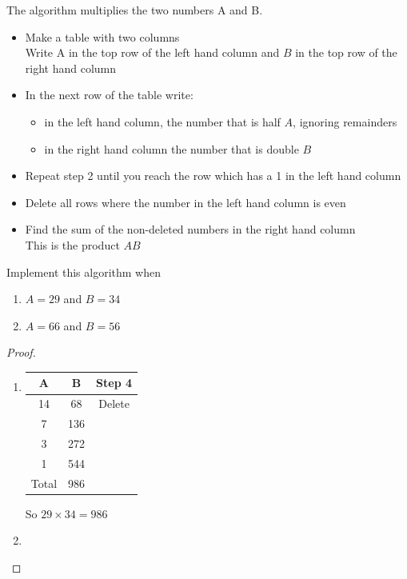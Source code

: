 \documentclass[a4paper]{article}
\begin{document}
\begin{eg}
	The algorithm multiplies the two numbers A and B.
	\begin{itemize}
		\item Make a table with two columns\\Write A in the top row of the left hand column and $B$ in the top row of the right hand column
		\item In the next row of the table write: \begin{itemize}\item in the left hand column, the number that is half $A$, ignoring remainders \item in the right hand column the number that is double $B$ \end{itemize}
		\item Repeat step 2 until you reach the row which has a 1 in the left hand column
		\item Delete all rows where the number in the left hand column is even
		\item Find the sum of the non-deleted numbers in the right hand column\\This is the product $AB$
	\end{itemize}
	Implement this algorithm when
	\begin{enumerate}
		\item $A=29$ and $B=34$
		\item $A=66$ and $B=56$
	\end{enumerate}
	\begin{proof}
		\begin{centering}
			\begin{enumerate}
				\item \begin{tabular}{|c|c|c|}
					      \hline
					      A     & B   & Step 4 \\
					      \hline
					      14    & 68  & Delete \\
					      \hline
					      7     & 136 &        \\
					      \hline
					      3     & 272 &        \\
					      \hline
					      1     & 544 &        \\
					      \hline
					      Total & 986 &        \\
					      \hline
				      \end{tabular}
				      So $29 \times 34 =986$
				\item \begin{tabular}{|c|c|c|}

\end{tabular}
\end{enumerate}
\end{centering}
\end{proof}
\end{eg}
\end{document}
